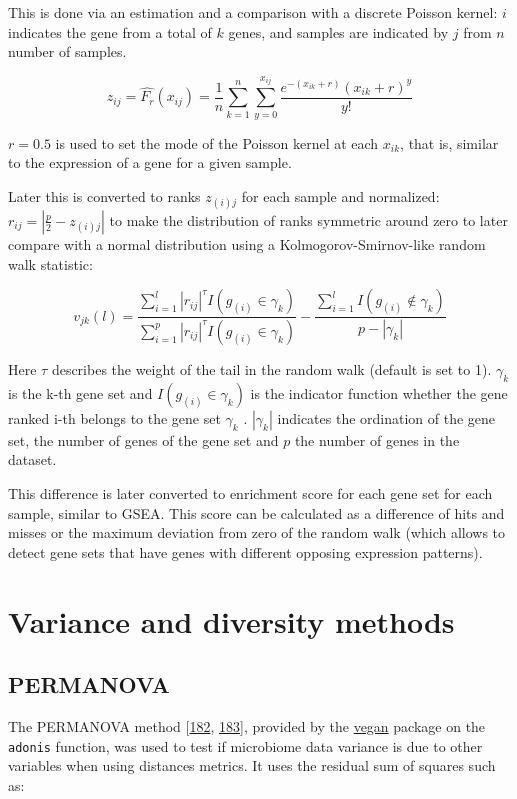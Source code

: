 \documentclass[
  12pt,
  a4paper,
  twoside,
  openright]{book}
\begin{document}
This is done via an estimation and a comparison with a discrete Poisson kernel: \(i\) indicates the gene from a total of \(k\) genes, and samples are indicated by \(j\) from \(n\) number of samples.

\[
z_{ij}=\hat{F_r}(x_{ij}) = \frac{1}{n}\sum_{k=1}^n\sum_{y=0}^{x_{ij}}\dfrac{e^{-(x_{ik}+r)}(x_{ik} + r)^y }{y!}
\]

\(r = 0.5\) is used to set the mode of the Poisson kernel at each \(x_{ik}\), that is, similar to the expression of a gene for a given sample.

Later this is converted to ranks \(z_{(i)j}\) for each sample and normalized: \(r_{ij}=|\frac{p}{2}-z_{(i)j}|\) to make the distribution of ranks symmetric around zero to later compare with a normal distribution using a Kolmogorov-Smirnov-like random walk statistic:

\[
v_{jk}(l)=\dfrac{\sum_{i=1}^l|r_{ij}|^{\tau}I(g_{(i)}\in \gamma_k)}{\sum_{i=1}^p|r_{ij}|^{\tau}I(g_{(i)} \in \gamma_k)}
- \dfrac{\sum_{i=1}^lI(g_{(i)} \not \in\gamma_k)}{p-|\gamma_k|}
\]

Here \(\tau\) describes the weight of the tail in the random walk (default is set to 1).
\(\gamma_k\) is the k-th gene set and \(I(g_{(i)}\in \gamma_k)\) is the indicator function whether the gene ranked i-th belongs to the gene set \(\gamma_k\) .
\(|\gamma_k|\) indicates the ordination of the gene set, the number of genes of the gene set and \(p\) the number of genes in the dataset.

This difference is later converted to enrichment score for each gene set for each sample, similar to GSEA.
This score can be calculated as a difference of hits and misses or the maximum deviation from zero of the random walk (which allows to detect gene sets that have genes with different opposing expression patterns).

\hypertarget{variance}{%
\section{Variance and diversity methods}\label{variance}}

\hypertarget{permanova}{%
\subsection{PERMANOVA}\label{permanova}}

The PERMANOVA method {[}\protect\hyperlink{ref-anderson2001}{182}, \protect\hyperlink{ref-warton2012}{183}{]}, provided by the \href{https://cran.r-project.org/package=vegan}{vegan} package on the \texttt{adonis} function, was used to test if microbiome data variance is due to other variables when using distances metrics.
It uses the residual sum of squares such as:
\end{document}
